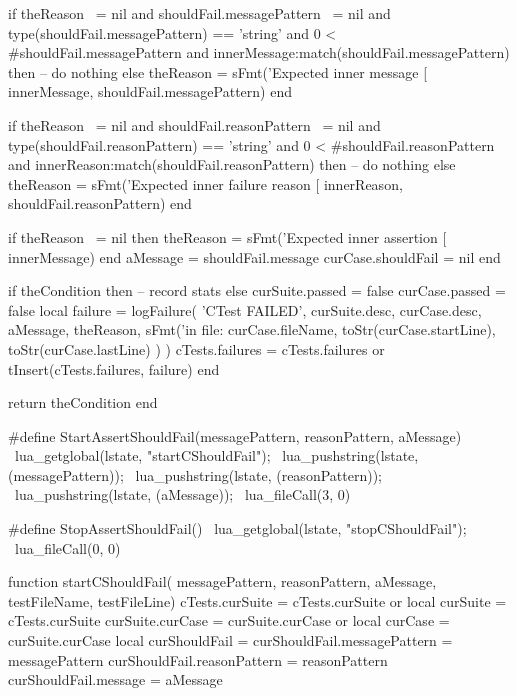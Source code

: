     if theReason ~= nil
      and shouldFail.messagePattern ~= nil
      and type(shouldFail.messagePattern) == 'string'
      and 0 < #shouldFail.messagePattern
      and innerMessage:match(shouldFail.messagePattern) then
      -- do nothing
    else
      theReason = sFmt('Expected inner message [%
        innerMessage, shouldFail.messagePattern)
    end

    if theReason ~= nil
      and shouldFail.reasonPattern ~= nil
      and type(shouldFail.reasonPattern) == 'string'
      and 0 < #shouldFail.reasonPattern
      and innerReason:match(shouldFail.reasonPattern) then
      -- do nothing
    else
      theReason = sFmt('Expected inner failure reason [%
        innerReason, shouldFail.reasonPattern)
    end
    
    if theReason ~= nil then
      theReason = sFmt('Expected inner assertion [%
        innerMessage)
    end
    aMessage = shouldFail.message
    curCase.shouldFail = nil
  end
  
  if theCondition then
    -- record stats
  else
    curSuite.passed = false
    curCase.passed  = false
    local failure = logFailure(
      'CTest FAILED',
      curSuite.desc,
      curCase.desc,
      aMessage,
      theReason,
      sFmt('in file: %
        curCase.fileName,
        toStr(curCase.startLine),
        toStr(curCase.lastLine)
      )
    )
    cTests.failures = cTests.failures or { }
    tInsert(cTests.failures, failure)
  end

  return theCondition
end
\stopLuaCode


\startCHeader
#define StartAssertShouldFail(messagePattern, reasonPattern, aMessage) \
  lua_getglobal(lstate, "startCShouldFail");                           \
  lua_pushstring(lstate, (messagePattern));                            \
  lua_pushstring(lstate, (reasonPattern));                             \
  lua_pushstring(lstate, (aMessage));                                  \
  lua_fileCall(3, 0)

#define StopAssertShouldFail()              \
  lua_getglobal(lstate, "stopCShouldFail"); \
  lua_fileCall(0, 0)
\stopCHeader

\startLuaCode
function startCShouldFail(
  messagePattern, reasonPattern, aMessage,
  testFileName, testFileLine)
  cTests.curSuite    = cTests.curSuite or { }
  local curSuite     = cTests.curSuite
  curSuite.curCase   = curSuite.curCase or { }
  local curCase      = curSuite.curCase
  local curShouldFail   = { }
  curShouldFail.messagePattern = messagePattern
  curShouldFail.reasonPattern  = reasonPattern
  curShouldFail.message        = aMessage
  

